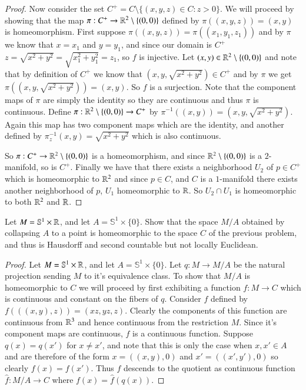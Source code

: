 \documentclass{homework651}
\def\SS{\mathbb{S}}
\begin{document}
\begin{problems}
\begin{enumerate}
\begin{proof}
    Now consider the set $C^+ = C \setminus \{(x, y, z) \in C: z > 0\}$. We will proceed by showing that the map $\pi:C^+ \to \RR^2 \setminus \{(0 ,0)\}$ defined by $\pi((x, y, z)) = (x, y)$ is homeomorphism. 
    First suppose $\pi((x, y, z)) = \pi((x_1, y_1, z_1))$ and by $\pi$ we know that $x = x_1$ and $y = y_1$, and since our domain is $C^+$
    $z = \sqrt{x^2 + y^2} = \sqrt{x_1^2 + y_1^2} = z_1$, so $f$ is injective. Let $(x, y) \in  \RR^2 \setminus \{(0 ,0)\}$ and note that by definition of $C^+$ we know that $(x, y , \sqrt{x^2 + y^2}) \in C^+$ and by $\pi$ we get $\pi((x, y , \sqrt{x^2 + y^2})) = (x, y)$. So $f$ 
    is a surjection. Note that the component maps of $\pi$ are simply the identity so they are continuous and thus $\pi$ is continuous. 
    Define $\pi:\RR^2 \setminus \{(0 ,0)\} \to C^+$ by $\pi^{-1}((x, y)) = (x, y,\sqrt{x^2 + y^2})$. Again this map has two component maps which 
    are the identity, and another defined by $\pi_z^{-1}(x, y) = \sqrt{x^2 + y^2}$ which is also continuous. 

    So $\pi:C^+ \to \RR^2 \setminus \{(0 ,0)\}$ is a homeomorphism, and since $\RR^2 \setminus \{(0 ,0)\}$ is a $2$-manifold, so is $C^+$. Finally we have that there exists a neighborhood $U_2$ of $p \in C^+$ which is homeomorphic to $\RR^2$ and since $p \in C$, and $C$ is a $1$-manifold there exists another neighborhood of $p$, $U_1$ homeomorphic to $\RR$. So 
    $U_2 \cap U_1$ is homeomorphic to both $\RR^2$ and $\RR$. 
    \end{proof}
\end{enumerate}

\problem Let $M = \SS^1 \times \RR$, and let $A = \SS^1 \times \{0\}$. Show that the space $M/A$ obtained by collapsing $A$
to a point is homeomorphic to the space $C$ of the previous problem, and thus is Hausdorff and second countable but not locally Euclidean.  
\begin{proof} Let $M = \SS^1 \times \RR$, and let $A = \SS^1 \times \{0\}$. Let $q: M \to M/A$ be the natural projection sending $M$ to it's equivalence class. To show that $M/A$ is homeomorphic to $C$ we will proceed by first exhibiting a function $f: M \to C$ which is continuous and constant on the fibers of $q$. Consider $f$ defined by $f(((x, y), z)) = (xz, yz, z)$. Clearly the components of this function are continuous from $\RR^3$ and hence continuous from the restriction $M$. Since it's component maps are continuous, $f$ is a continuous function. Suppose $q(x) = q(x')$ for $x \neq x'$, and note that this is only the case when $x, x' \in A$ and are therefore of the form $x = ((x, y), 0)$ and $x' = ((x', y'), 0)$ so clearly $f(x) = f(x')$. Thus $f$ descends to the quotient as continuous function $\hat{f}:  M/A \to C$ where $f(x) = \hat{f}(q(x))$.



\end{proof}
\end{problems}
\end{document}
